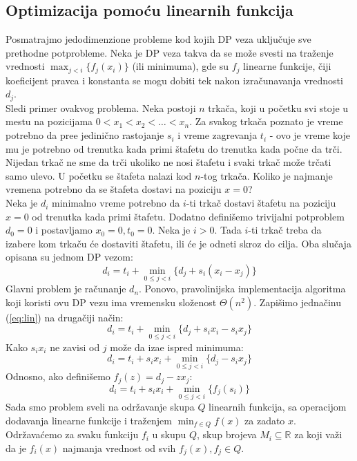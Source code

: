 \documentclass[a4paper,12pt]{article}
\numberwithin{equation}{subsection}
\begin{document}
\subsection{Optimizacija pomo\' cu linearnih funkcija}

Posmatrajmo jedodimenzione probleme kod kojih DP veza uklju\v cuje sve prethodne potprobleme. Neka je DP veza takva da se mo\v ze svesti na tra\v zenje vrednosti $\max_{j<i} \{ f_j(x_i) \}$ (ili minimuma), gde su $f_j$ linearne funkcije, \v ciji koeficijent pravca i konstanta se mogu dobiti tek nakon izra\v cunavanja vrednosti $d_j$.
\\

Sledi primer ovakvog problema. Neka postoji $n$ trka\v ca, koji u po\v cetku svi stoje u mestu na pozicijama $0 < x_1 < x_2 < \ldots < x_n$. Za svakog trka\v ca poznato je vreme potrebno da pre\dj e jedini\v cno rastojanje $s_i$ i vreme zagrevanja $t_i$ - ovo je vreme koje mu je potrebno od trenutka kada primi \v stafetu do trenutka kada po\v cne da tr\v ci. Nijedan trka\v c ne sme da tr\v ci ukoliko ne nosi \v stafetu i svaki trka\v c mo\v ze tr\v cati samo ulevo. U po\v cetku se \v stafeta nalazi kod $n$-tog trka\v ca. Koliko je najmanje vremena potrebno da se \v stafeta dostavi na poziciju $x = 0$?
\\

Neka je $d_i$ minimalno vreme potrebno da $i$-ti trka\v c dostavi \v stafetu na poziciju $x = 0$ od trenutka kada primi \v stafetu. Dodatno defini\v semo trivijalni potproblem $d_0 = 0$ i postavljamo $x_0 = 0, t_0 = 0$. Neka je $i > 0$. Tada $i$-ti trka\v c treba da izabere kom trka\v cu \' ce dostaviti \v stafetu, ili \' ce je odneti skroz do cilja. Oba slu\v caja opisana su jednom DP vezom:
\begin{equation} \label{eq:lin}
	d_i = t_i + \min_{0 \leq j < i} \{ d_j + s_i(x_i-x_j) \}
\end{equation}
Glavni problem je ra\v cunanje $d_n$. Ponovo, pravolinijska implementacija algoritma koji koristi ovu DP vezu ima vremensku slo\v zenost $\Theta(n^2)$. Zapi\v simo jedna\v cinu (\ref{eq:lin}) na druga\v ciji na\v cin:
$$
	d_i = t_i + \min_{0 \leq j < i} \{ d_j + s_i x_i - s_i x_j \}
$$
Kako $s_i x_i$ ne zavisi od $j$ mo\v ze da iza\dj e ispred minimuma:
$$
	d_i = t_i + s_i x_i + \min_{0 \leq j < i} \{ d_j - s_i x_j \}
$$
Odnosno, ako defini\v semo $f_j(z) = d_j - z x_j$:
$$
	d_i = t_i + s_i x_i + \min_{0 \leq j < i} \{ f_j(s_i) \}
$$
Sada smo problem sveli na odr\v zavanje skupa $Q$ linearnih funkcija, sa operacijom dodavanja linearne funkcije i tra\v zenjem $\min_{f \in Q} f(x)$ za zadato $x$. Odr\v zava\' cemo za svaku funkciju $f_i$ u skupu $Q$, skup brojeva $M_i \subseteq \mathbb{R}$ za koji va\v zi da je $f_i(x)$ najmanja vrednost od svih $f_j(x), f_j \in Q$.
\\
\end{document}
